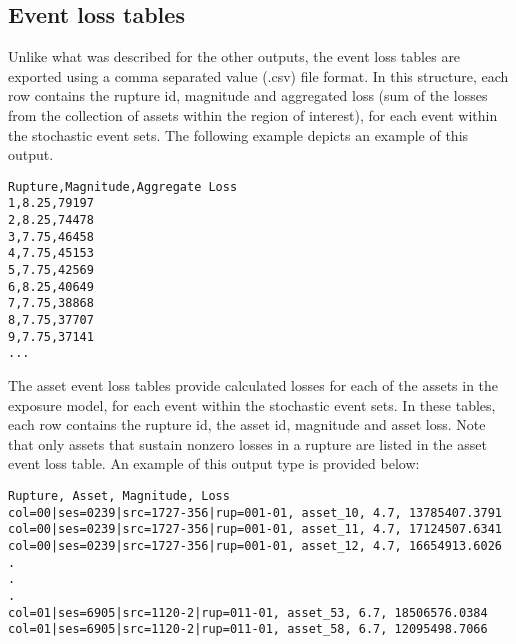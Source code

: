 \subsection{Event loss tables}

Unlike what was described for the other outputs, the event loss tables are
exported using a comma separated value (.csv) file format. In this structure,
each row contains the rupture id, magnitude and aggregated loss (sum of the
losses from the collection of assets within the region of interest), for each
event within the stochastic event sets. The following example depicts an
example of this output.

\begin{Verbatim}[frame=single, commandchars=\\\{\}, samepage=false]
Rupture,Magnitude,Aggregate Loss
1,8.25,79197
2,8.25,74478
3,7.75,46458
4,7.75,45153
5,7.75,42569
6,8.25,40649
7,7.75,38868
8,7.75,37707
9,7.75,37141
...
\end{Verbatim}

The asset event loss tables provide calculated losses for each of the assets
in the exposure model, for each event within the stochastic event sets. In
these tables, each row contains the rupture id, the asset id, magnitude and
asset loss. Note that only assets that sustain nonzero losses in a rupture are
listed in the asset event loss table. An example of this output type is
provided below:

\begin{Verbatim}[frame=single, commandchars=\\\{\}, samepage=false]
Rupture, Asset, Magnitude, Loss
col=00|ses=0239|src=1727-356|rup=001-01, asset_10, 4.7, 13785407.3791
col=00|ses=0239|src=1727-356|rup=001-01, asset_11, 4.7, 17124507.6341
col=00|ses=0239|src=1727-356|rup=001-01, asset_12, 4.7, 16654913.6026
.
.
.
col=01|ses=6905|src=1120-2|rup=011-01, asset_53, 6.7, 18506576.0384
col=01|ses=6905|src=1120-2|rup=011-01, asset_58, 6.7, 12095498.7066
\end{Verbatim}
